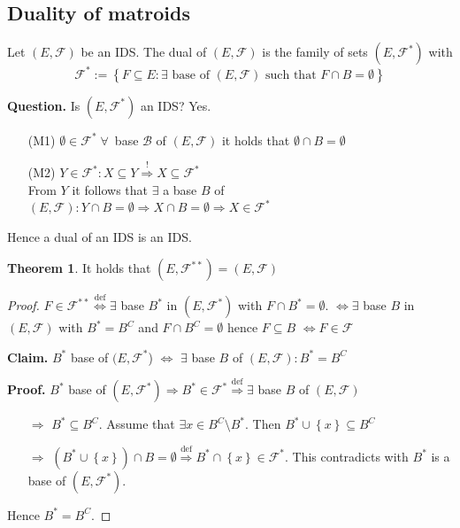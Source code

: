 \documentclass[a4paper]{article}
\theoremstyle{definition}
\newtheorem{theorem}{Theorem}
\newcommand{\set}[1]{\left\{#1\right\}}
\newcommand{\fall}{\;\forall\,}
\begin{document}
\subsection{Duality of matroids}
%
Let $(E, \mathcal{F})$ be an IDS. The dual of $(E, \mathcal{F})$ is the family of sets $(E, \mathcal{F}^*)$ with
\[
  \mathcal{F}^* := \set{F \subseteq E: \exists \text{ base of } (E, \mathcal{F}) \text{ such that } F \cap B = \emptyset}
\]

\textbf{Question.}
  Is $(E, \mathcal{F}^*)$ an IDS? Yes.

  \begin{itemize}
    \item[(M1)] $\emptyset \in \mathcal{F}^* \fall$ base $\mathcal{B}$ of $(E, \mathcal{F})$ it holds that $\emptyset \cap B = \emptyset$
    \item[(M2)] $Y \in \mathcal{F}^*: X \subseteq Y \stackrel{!}{\Rightarrow} X \subseteq \mathcal{F}^*$ \\
      From $Y$ it follows that $\exists$ a base $B$ of $(E, \mathcal{F}): Y \cap B = \emptyset \Rightarrow X \cap B = \emptyset \Rightarrow X \in \mathcal{F}^*$
  \end{itemize}

  Hence a dual of an IDS is an IDS.

\begin{theorem}
  \label{proposition-8.9}
  It holds that $(E, \mathcal{F}^{**}) = (E, \mathcal{F})$
\end{theorem}

\begin{proof}
  $F \in \mathcal{F}^{**} \stackrel{\text{def}}{\Leftrightarrow} \exists$ base $B^*$ in $(E, \mathcal{F}^*)$ with $F \cap B^* = \emptyset$.
  $\Leftrightarrow \exists$ base $B$ in $(E, \mathcal{F})$ with $B^* = B^C$ and $F \cap B^C = \emptyset$ hence $F \subseteq B$
  $\Leftrightarrow F \in \mathcal{F}$

  \textbf{Claim.} $B^*$ base of $(E, \mathcal{F}^*$) $\Leftrightarrow$ $\exists$ base $B$ of $(E, \mathcal{F}): B^* = B^C$

  \textbf{Proof.}
    $B^*$ base of $(E, \mathcal{F}^*) \Rightarrow B^* \in \mathcal{F}^* \stackrel{\text{def}}{\Rightarrow} \exists$ base $B$ of $(E, \mathcal{F})$
    \begin{itemize}
      \item[$\Rightarrow$] $B^* \subseteq B^C$. Assume that $\exists x \in B^C \setminus B^*$. Then $B^* \cup \set{x} \subseteq B^C$
      \item[$\Rightarrow$] $(B^* \cup \set{x}) \cap B = \emptyset \stackrel{\text{def}}{\Rightarrow} B^* \cap \set{x} \in \mathcal{F}^*$. This contradicts with $B^*$ is a base of $(E, \mathcal{F}^*)$.
    \end{itemize}

  Hence $B^* = B^C$.
\end{proof}
\end{document}
